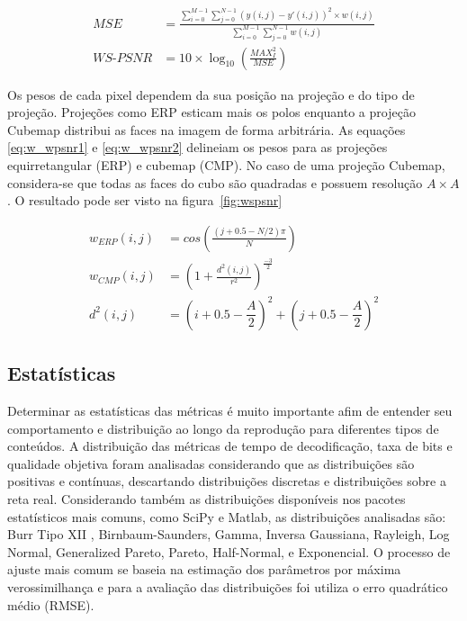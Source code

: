 {\begin{align}
        \label{eq:WMSE}
        MSE&= \frac{\sum^{M-1}_{i=0}\sum^{N-1}_{j=0} \left(y(i,j) - y'(i,j)\right)^2 \times w(i,j)}{\sum^{M-1}_{i=0} \sum^{N-1}_{j=0} w(i,j)}\\[12pt]
        \label{eq:WS-PSNR}
        WS\mbox{-}PSNR&=10 \times \log_{10}\left(\frac{MAX^2_I}{MSE}\right)
\end{align}

Os pesos de cada pixel dependem da sua posição na projeção e do tipo de projeção. Projeções como ERP esticam mais os polos enquanto a projeção Cubemap distribui as faces na imagem de forma arbitrária. As equações \ref{eq:w_wpsnr1} e \ref{eq:w_wpsnr2} delineiam os pesos para as projeções equirretangular (ERP) e cubemap (CMP). No caso de uma projeção Cubemap, considera-se que todas as faces do cubo são quadradas e possuem resolução $A \times A$. O resultado pode ser visto na figura~\ref{fig:wspsnr}

\begin{align}
        \label{eq:w_wpsnr1}
        w_{ERP}(i,j)&=cos\left(\frac{(j+0.5-N/2)\pi}{N}\right) \\
        \label{eq:w_wpsnr2}
        w_{CMP}(i,j)&=\left(1 + \frac{d^2(i,j)}{r^2}\right)^{\frac{-3}{2}} \\
        d^2(i, j)&=(i+0.5-\dfrac{A}{2})^2 +(j+0.5-\dfrac{A}{2})^2
\end{align}

\subsection{Estatísticas}

Determinar as estatísticas das métricas é muito importante afim de entender seu comportamento e distribuição ao longo da reprodução para diferentes tipos de conteúdos. A distribuição das métricas de tempo de decodificação, taxa de bits e qualidade objetiva foram analisadas considerando que as distribuições são positivas e contínuas, descartando distribuições discretas e distribuições sobre a reta real. Considerando também as distribuições disponíveis nos pacotes estatísticos mais comuns, como SciPy e Matlab, as distribuições analisadas são: Burr Tipo XII , Birnbaum-Saunders, Gamma, Inversa Gaussiana, Rayleigh, Log Normal, Generalized Pareto, Pareto, Half-Normal, e Exponencial. O processo de ajuste mais comum se baseia na estimação dos parâmetros por máxima verossimilhança e para a avaliação das distribuições foi utiliza o erro quadrático médio (RMSE).

}
